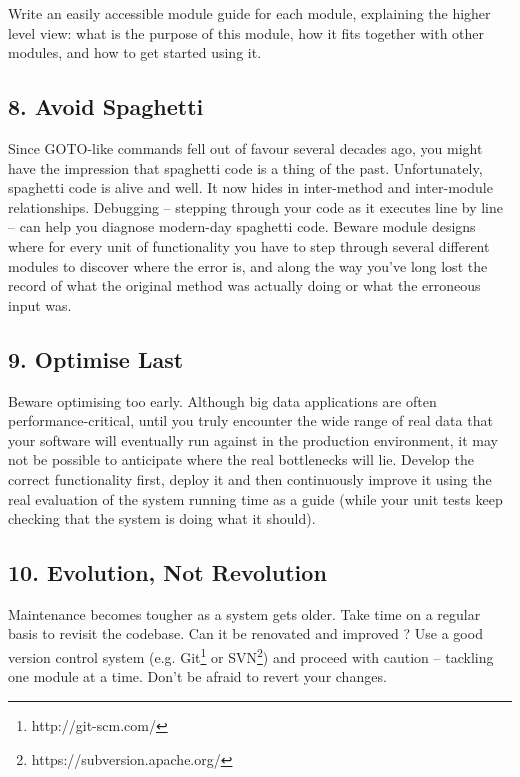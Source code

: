 \documentclass{bmcart}
\begin{document}
Write an easily accessible module guide for each module, explaining the higher level view: what is the purpose of this module, how it fits together with other modules, and how to get started using it. 

\subsection*{8. Avoid Spaghetti}

Since GOTO-like commands fell out of favour several decades ago, you might have the impression that spaghetti code is a thing of the past. Unfortunately, spaghetti code is alive and well. It now hides in inter-method and inter-module relationships. Debugging -- stepping through your code as it executes line by line -- can help you diagnose modern-day spaghetti code. Beware module designs where for every unit of functionality you have to step through several different modules to discover where the error is, and along the way you've long lost the record of what the original method was actually doing or what the erroneous input was. 

\subsection*{9. Optimise Last}

Beware optimising too early. Although big data applications are often performance-critical, until you truly encounter the wide range of real data that your software will eventually run against in the production environment, it may not be possible to anticipate where the real bottlenecks will lie. Develop the correct functionality first, deploy it and then continuously improve it using the real evaluation of the system running time as a guide (while your unit tests keep checking that the system is doing what it should). 

\subsection*{10. Evolution, Not Revolution}

Maintenance becomes tougher as a system gets older. Take time on a regular basis to revisit the codebase. Can it be renovated and improved \cite{refactoring}? Use a good version control system (e.g. Git\footnote{http://git-scm.com/} or SVN\footnote{https://subversion.apache.org/}) and proceed with caution -- tackling one module at a time. Don't be afraid to revert your changes. 
\end{document}
